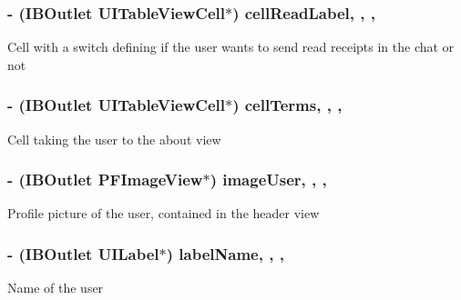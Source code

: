 \subsubsection[{cell\+Read\+Label}]{\setlength{\rightskip}{0pt plus 5cm}-\/ (I\+B\+Outlet U\+I\+Table\+View\+Cell$\ast$) cell\+Read\+Label\hspace{0.3cm}{\ttfamily [read]}, {\ttfamily [write]}, {\ttfamily [nonatomic]}, {\ttfamily [strong]}}\label{category_e_s_settings_view_07_08_a882b94f63ca9dc1f83033b8614df7c4d}
Cell with a switch defining if the user wants to send read receipts in the chat or not \hypertarget{category_e_s_settings_view_07_08_afbe8cfe1c7ec9b5f92326e693d916ed0}{}
\subsubsection[{cell\+Terms}]{\setlength{\rightskip}{0pt plus 5cm}-\/ (I\+B\+Outlet U\+I\+Table\+View\+Cell$\ast$) cell\+Terms\hspace{0.3cm}{\ttfamily [read]}, {\ttfamily [write]}, {\ttfamily [nonatomic]}, {\ttfamily [strong]}}\label{category_e_s_settings_view_07_08_afbe8cfe1c7ec9b5f92326e693d916ed0}
Cell taking the user to the about view \hypertarget{category_e_s_settings_view_07_08_a085505d50a3d26b8ac992212b58b378d}{}
\subsubsection[{image\+User}]{\setlength{\rightskip}{0pt plus 5cm}-\/ (I\+B\+Outlet P\+F\+Image\+View$\ast$) image\+User\hspace{0.3cm}{\ttfamily [read]}, {\ttfamily [write]}, {\ttfamily [nonatomic]}, {\ttfamily [strong]}}\label{category_e_s_settings_view_07_08_a085505d50a3d26b8ac992212b58b378d}
Profile picture of the user, contained in the header view \hypertarget{category_e_s_settings_view_07_08_a5437b42a935c42e721853206c9b13748}{}
\subsubsection[{label\+Name}]{\setlength{\rightskip}{0pt plus 5cm}-\/ (I\+B\+Outlet U\+I\+Label$\ast$) label\+Name\hspace{0.3cm}{\ttfamily [read]}, {\ttfamily [write]}, {\ttfamily [nonatomic]}, {\ttfamily [strong]}}\label{category_e_s_settings_view_07_08_a5437b42a935c42e721853206c9b13748}
Name of the user \hypertarget{category_e_s_settings_view_07_08_acf033cccb7b67db231b0cd5d7b7a79c5}{}
